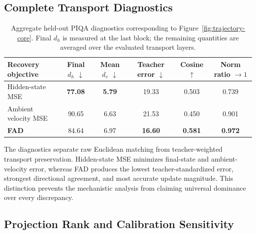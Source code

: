 \documentclass{article}
\theoremstyle{plain}
\theoremstyle{definition}
\theoremstyle{remark}
\begin{document}
\subsection{Complete Transport Diagnostics}
\label{app:transport-diagnostics}

\begin{table}[H]
\caption{Aggregate held-out PIQA diagnostics corresponding to
Figure~\ref{fig:trajectory-core}.  Final $d_h$ is measured at the last block; the
remaining quantities are averaged over the evaluated transport layers.}
\label{tab:app-transport-diagnostics}
\centering
\footnotesize
\setlength{\tabcolsep}{4.3pt}
\renewcommand{\arraystretch}{1.04}
\begin{tabular}{@{}lccccc@{}}
\toprule
\textbf{Recovery objective} & \textbf{Final $d_h$ $\downarrow$}
& \textbf{Mean $d_v$ $\downarrow$} & \textbf{Teacher error $\downarrow$}
& \textbf{Cosine $\uparrow$} & \textbf{Norm ratio $\to1$}\\
\midrule
Hidden-state MSE & \textbf{77.08} & \textbf{5.79} & 19.33 & 0.503 & 0.739\\
Ambient velocity MSE & 90.65 & 6.63 & 21.53 & 0.450 & 0.901\\
\textbf{FAD} & 84.64 & 6.97 & \textbf{16.60} & \textbf{0.581} & \textbf{0.972}\\
\bottomrule
\end{tabular}
\end{table}

The diagnostics separate raw Euclidean matching from teacher-weighted transport
preservation.  Hidden-state MSE minimizes final-state and ambient-velocity error,
whereas FAD produces the lowest teacher-standardized error, strongest directional
agreement, and most accurate update magnitude.  This distinction prevents the
mechanistic analysis from claiming universal dominance over every discrepancy.

\subsection{Projection Rank and Calibration Sensitivity}
\end{document}

